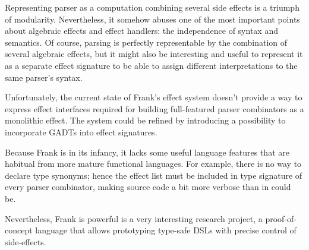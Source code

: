     Representing parser as a computation combining several side effects is a
    triumph of modularity. Nevertheless, it somehow abuses one of the most important
    points about algebraic effects and effect handlers: the independence of
    syntax and semantics. Of course, parsing is perfectly representable by the
    combination of several algebraic effects, but it might also be interesting
    and useful to represent it as a separate effect signature to be able to assign
    different interpretations to the same parser's syntax.

    Unfortunately, the current state of Frank's effect system doesn't provide a way
    to express effect interfaces required for building full-featured parser combinators
    as a monolithic effect. The system could be refined by introducing a possibility
    to incorporate GADTs into effect signatures.

    Because Frank is in its infancy, it lacks some useful language features that
    are habitual from more mature functional languages. For example, there is no
    way to declare type synonyms; hence the
    effect list must be included in type signature of every parser combinator, making
    source code a bit more verbose than in could be.

    Nevertheless, Frank is powerful is a very interesting research project, a
    proof-of-concept language that allows prototyping type-safe DSLs with precise
    control of side-effects.


